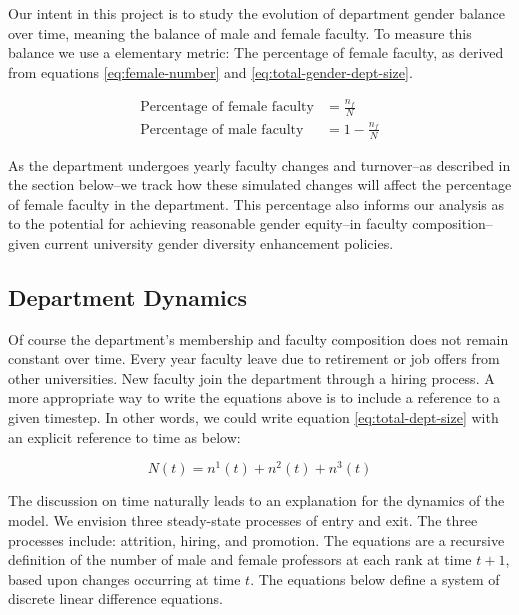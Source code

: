 \documentclass[12pt, a4paper, oneside, headinclude, footinclude,english]{article}
\begin{document}
Our intent in this project is to study the evolution of department gender balance
over time, meaning the balance of male and female faculty. To measure this
balance we use a elementary metric: The percentage of female
faculty, as derived from equations \ref{eq:female-number} and \ref{eq:total-gender-dept-size}. 

\begin{align}
  \label{eq:pct-female}
  \text{Percentage of female faculty} &= \frac{n_f}{N} \label{eq:pct-female} \\
  \text{Percentage of male faculty} &= 1 - \frac{n_f}{N}          
\end{align}

As the department undergoes yearly faculty changes and turnover--as described in
the section below--we track how these simulated changes will affect the
percentage of female faculty in the department. This percentage also informs our
analysis as to the potential for achieving reasonable gender equity--in faculty
composition--given current university gender diversity enhancement policies.

\subsection{Department Dynamics}
\label{sec:dept-dynamics}

Of course the department's membership and faculty composition does not remain
constant over time. Every year faculty leave due to retirement or
job offers from other universities. New faculty join the department through a
hiring process. A more appropriate way to write the equations above is to
include a reference to a given timestep. In other words, we could write equation
\ref{eq:total-dept-size} with an explicit reference to time as below:

\begin{equation*}
  N(t) = n^1(t) + n^2(t) + n^3(t) \label{eq:test}
\end{equation*}

The discussion on time naturally leads to an explanation for the dynamics of the
model. We envision three steady-state processes of entry and exit. The three processes include:
attrition, hiring, and promotion. The equations are a recursive definition of
the number of male and female professors at each rank at time $t+1$, based upon
changes occurring at time $t$. The equations below define a system of discrete
linear difference equations. 
\end{document}
